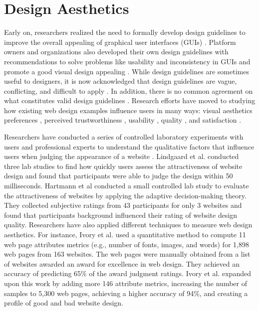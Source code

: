 \section{Design Aesthetics}

Early on, researchers realized the need to formally develop design guidelines to improve the overall appealing of graphical user interfaces (GUIs) \cite{Gould_1983_CHI, hewett_1986_CHI}.
Platform owners and organizations also developed their own design guidelines with recommendations to solve problems like usability and inconsistency in GUIs and promote a good visual design appealing \cite{Web_Design_W3C,Design_for_Android, Design_for_iOS, Design_for_Windows}.
While design guidelines are sometimes useful to designers, it is now acknowledged that design guidelines are vague, conflicting, and difficult to apply \cite{borges_1996_CHI_Guidelines,de_1990_INTERACT_Guidelines,lowgren_1992_CHI_knowledge,ivory_2001_CHI_empirically}.
In addition, there is no common agreement on what constitutes valid design guidelines \cite{ratner_1996_CHIComp_characterization}.
Research efforts have moved to studying how existing web design examples influence users in many ways: visual aesthetics preferences \cite{reinecke_2011_TOCHI,reinecke_2013_CHI,reinecke_2014_CHI}, perceived trustworthiness \cite{Basso_EC_2001,lindgaard_2011_TOCHI_trustworthiness}, usability \cite{Gould_1983_CHI,tractinsky_1997_CHI_aesthetics,krug_2005_book,van_2008_IC_modelling}, quality \cite{hartmann_2008_TOCHI}, and satisfaction \cite{teo_2003_HCS_empirical}.

Researchers have conducted a series of controlled laboratory experiments with users and professional experts to understand the qualitative factors that influence users when judging the appearance of a website \cite{teo_2003_HCS_empirical, lavie_2004_HCS_assessing, hartmann_2008_TOCHI}. 
Lindgaard et al. \cite{lindgaard_2006_BIT_attention} conducted three lab studies to find how quickly users assess the attractiveness of website design and found that participants were able to judge the design within 50 milliseconds.
Hartmann et al \cite{Hartmann_CHI_2008} conducted a small controlled lab study to evaluate the attractiveness of websites by applying the adaptive decision-making theory.
They collected subjective ratings from 43 participants for only 3 websites and found that participants background influenced their rating of website design quality.
Researchers have also applied different techniques to measure web design aesthetics. 
For instance, Ivory et al. \cite{ivory_2001_CHI_empirically} used a quantitative method to compute 11 web page attributes metrics (e.g., number of fonts, images, and words) for 1,898 web pages from 163 websites.
The web pages were manually obtained from a list of websites awarded an award for excellence in web design.
They achieved an accuracy of predicting 65\% of the award judgment ratings.
Ivory et al. \cite{ivory_statistical_2002} expanded upon this work by adding more 146 attribute metrics, increasing the number of samples to 5,300 web pages, achieving a higher accuracy of 94\%, and creating a profile
of good and bad website design.

